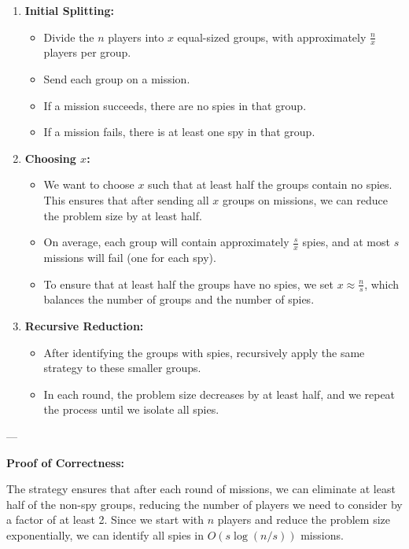 \documentclass[11pt]{article}
\begin{document}
\begin{enumerate}
    \item \textbf{Initial Splitting:}
        \begin{itemize}
            \item Divide the \(n\) players into \(x\) equal-sized groups, with approximately \( \frac{n}{x} \) players per group.
            \item Send each group on a mission.
            \item If a mission succeeds, there are no spies in that group.
            \item If a mission fails, there is at least one spy in that group.
        \end{itemize}
    
    \item \textbf{Choosing \(x\):}
        \begin{itemize}
            \item We want to choose \(x\) such that at least half the groups contain no spies. This ensures that after sending all \(x\) groups on missions, we can reduce the problem size by at least half.
            \item On average, each group will contain approximately \( \frac{s}{x} \) spies, and at most \(s\) missions will fail (one for each spy).
            \item To ensure that at least half the groups have no spies, we set \(x \approx \frac{n}{s}\), which balances the number of groups and the number of spies.
        \end{itemize}
    
    \item \textbf{Recursive Reduction:}
        \begin{itemize}
            \item After identifying the groups with spies, recursively apply the same strategy to these smaller groups.
            \item In each round, the problem size decreases by at least half, and we repeat the process until we isolate all spies.
        \end{itemize}
\end{enumerate}

---

\textbf{Proof of Correctness:}

The strategy ensures that after each round of missions, we can eliminate at least half of the non-spy groups, reducing the number of players we need to consider by a factor of at least 2. Since we start with \(n\) players and reduce the problem size exponentially, we can identify all spies in \(O(s \log(n/s))\) missions.
\end{document}
